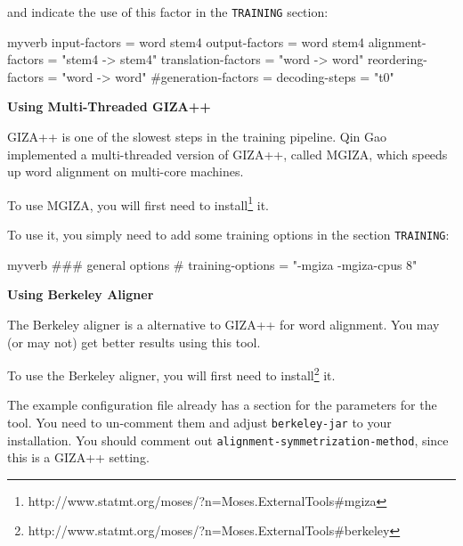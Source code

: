 and indicate the use of this factor in the {\tt TRAINING} section:






\begin{SaveVerbatim}{myverb}
 input-factors = word stem4
 output-factors = word stem4
 alignment-factors = "stem4 -> stem4"
 translation-factors = "word -> word"
 reordering-factors = "word -> word"
 #generation-factors = 
 decoding-steps = "t0"
\end{SaveVerbatim}
\colorbox{gray}{%
}

\vspace{2mm}

{\bf 
\label{experiment-perl.texntoc11}Using Multi-Threaded GIZA++}


GIZA++ is one of the slowest steps in the training pipeline. Qin Gao implemented a multi-threaded version of GIZA++, called MGIZA, which speeds up word alignment on multi-core machines.



To use MGIZA, you will first need to install\footnote{\sf http://www.statmt.org/moses/?n=Moses.ExternalTools\#mgiza} it.



To use it, you simply need to add some training options in the section {\tt TRAINING}:






\begin{SaveVerbatim}{myverb}
 ### general options
 #
 training-options = "-mgiza -mgiza-cpus 8"
\end{SaveVerbatim}
\colorbox{gray}{%
}

\vspace{2mm}

{\bf 
\label{experiment-perl.texntoc12}Using Berkeley Aligner}


The Berkeley aligner is a alternative to GIZA++ for word alignment. You may (or may not) get better results using this tool.



To use the Berkeley aligner, you will first need to install\footnote{\sf http://www.statmt.org/moses/?n=Moses.ExternalTools\#berkeley} it.



The example configuration file already has a section for the parameters for the tool. You need to un-comment them and adjust {\tt berkeley-jar} to your installation. You should comment out {\tt alignment-symmetrization-method}, since this is a GIZA++ setting.







